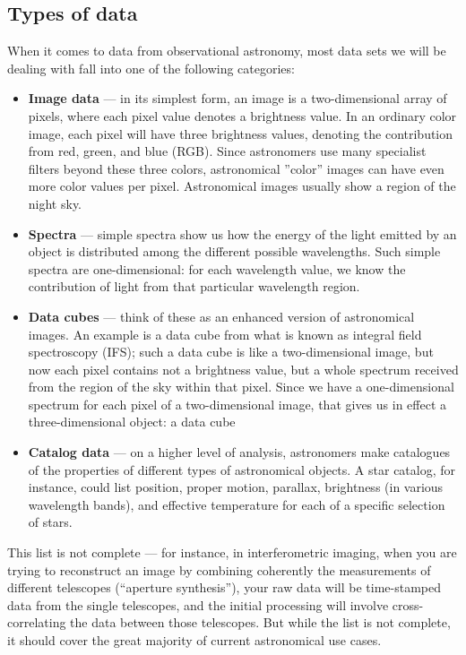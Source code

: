 \documentclass[twocolumn,apj]{openjournal}
\begin{document}
\subsection{Types of data}

When it comes to data from observational astronomy, most data sets we will be dealing with fall into one of the following categories:
\begin{itemize}
\item {\bf Image data} --- in its simplest form, an image is a two-dimensional array of pixels, where each pixel value denotes a brightness value. In an ordinary color image, each pixel will have three brightness values, denoting the contribution from red, green, and blue (RGB). Since astronomers use many specialist filters beyond these three colors, astronomical ''color'' images can have even more color values per pixel. Astronomical images usually show a region of the night sky. 
\item {\bf Spectra} --- simple spectra show us how the energy of the light emitted by an object is distributed among the different possible wavelengths. Such simple spectra are one-dimensional: for each wavelength value, we know the contribution of light from that particular wavelength region.
\item {\bf Data cubes} --- think of these as an enhanced version of astronomical images. An example is a data cube from what is known as integral field spectroscopy (IFS); such a data cube is like a two-dimensional image, but now each pixel contains not a brightness value, but a whole spectrum received from the region of the sky within that pixel. Since we have a one-dimensional spectrum for each pixel of a two-dimensional image, that gives us in effect a three-dimensional object: a data cube
\item {\bf Catalog data} --- on a higher level of analysis, astronomers make catalogues of the properties of different types of astronomical objects. A star catalog, for instance, could list position, proper motion, parallax, brightness (in various wavelength bands), and effective temperature for each of a specific selection of stars.
\end{itemize}
This list is not complete --- for instance, in interferometric imaging, when you are trying to reconstruct an image by combining coherently the measurements of different telescopes (``aperture synthesis''), your raw data will be time-stamped data from the single telescopes, and the initial processing will involve cross-correlating the data between those telescopes. But while the list is not complete, it should cover the great majority of current astronomical use cases.
\end{document}
